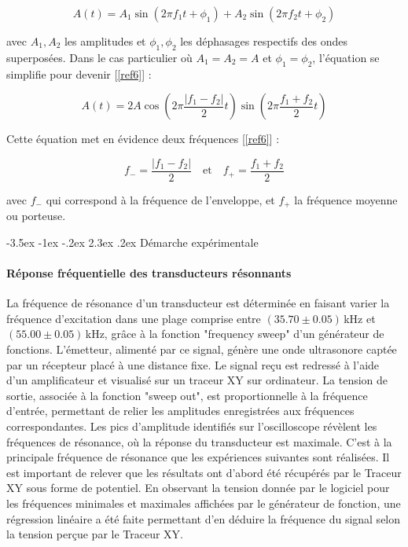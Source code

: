 \documentclass[a4paper, 12pt,oneside]{article}
\makeatletter
\renewcommand{\section}{\@startsection {section}{1}{\z@}%
             {-3.5ex \@plus -1ex \@minus -.2ex}%
             {2.3ex \@plus.2ex}%
             {\normalfont\normalsize\bfseries}}
\makeatother
\begin{document}
\vspace{-0.2cm}
\begin{equation}
A(t) = A_1 \sin(2 \pi f_1 t + \phi_1) + A_2 \sin(2 \pi f_2 t + \phi_2)
\label{eq5}
\end{equation}

\noindent avec $A_1, A_2$ les amplitudes et $\phi_1, \phi_2$ les déphasages respectifs des ondes superposées. Dans le cas particulier où $A_1 = A_2 = A$ et $\phi_1 = \phi_2$, l’équation se simplifie pour devenir [\ref{ref6}] :

\begin{equation}
A(t) = 2A \cos \left( 2 \pi \frac{|f_1 - f_2|}{2} t \right) \sin \left( 2 \pi \frac{f_1 + f_2}{2} t \right)
\label{eq6}
\end{equation}

\noindent Cette équation met en évidence deux fréquences [\ref{ref6}] : 

\begin{equation}
f_{-} = \frac{|f_1 - f_2|}{2} \quad \text{et} \quad f_{+} = \frac{f_1 + f_2}{2}
\label{eq7}
\end{equation}

\noindent avec $f_-$ qui correspond à la fréquence de l’enveloppe, et $f_+$ la fréquence moyenne ou porteuse.

\section{Démarche expérimentale}

\paragraph{Réponse fréquentielle des transducteurs résonnants}

La fréquence de résonance d’un transducteur est déterminée en faisant varier la fréquence d’excitation dans une plage comprise entre $(35.70 \pm 0.05)$\,kHz et $(55.00 \pm 0.05)$\,kHz, grâce à la fonction "frequency sweep" d’un générateur de fonctions. L’émetteur, alimenté par ce signal, génère une onde ultrasonore captée par un récepteur placé à une distance fixe. Le signal reçu est redressé à l’aide d’un amplificateur et visualisé sur un traceur XY sur ordinateur. La tension de sortie, associée à la fonction "sweep out", est proportionnelle à la fréquence d’entrée, permettant de relier les amplitudes enregistrées aux fréquences correspondantes. Les pics d’amplitude identifiés sur l’oscilloscope révèlent les fréquences de résonance, où la réponse du transducteur est maximale. C'est à la principale fréquence de résonance que les expériences suivantes sont réalisées. Il est important de relever que les résultats ont d'abord été récupérés par le Traceur XY sous forme de potentiel. En observant la tension donnée par le logiciel pour les fréquences minimales et maximales affichées par le générateur de fonction, une régression linéaire a été faite permettant d'en déduire la fréquence du signal selon la tension perçue par le Traceur XY.
\end{document}
